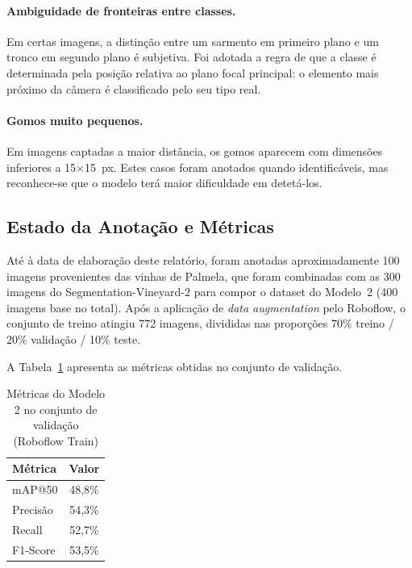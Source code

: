 \paragraph{Ambiguidade de fronteiras entre classes.}
Em certas imagens, a distinção entre um sarmento em primeiro plano e um
tronco em segundo plano é subjetiva. Foi adotada a regra de que a classe é
determinada pela posição relativa ao plano focal principal: o elemento mais
próximo da câmera é classificado pelo seu tipo real.

\paragraph{Gomos muito pequenos.}
Em imagens captadas a maior distância, os gomos aparecem com dimensões
inferiores a 15$\times$15~px. Estes casos foram anotados quando identificáveis,
mas reconhece-se que o modelo terá maior dificuldade em detetá-los.

\subsection{Estado da Anotação e Métricas}

Até à data de elaboração deste relatório, foram anotadas aproximadamente
100 imagens provenientes das vinhas de Palmela, que foram
combinadas com as 300 imagens do Segmentation-Vineyard-2 para compor o
dataset do Modelo~2 (400 imagens base no total). Após a aplicação de
\textit{data augmentation} pelo Roboflow, o conjunto de treino atingiu
772 imagens, divididas nas proporções 70\% treino / 20\% validação /
10\% teste.

A Tabela~\ref{tab:resultados_m2_dev} apresenta as métricas obtidas no
conjunto de validação.

\begin{table}[H]
  \centering
  \caption{Métricas do Modelo 2 no conjunto de validação (Roboflow Train)}
  \label{tab:resultados_m2_dev}
  \begin{tabular}{lc}
    \toprule
    \textbf{Métrica}   & \textbf{Valor} \\
    \midrule
    mAP@50             & 48,8\% \\
    Precisão           & 54,3\% \\
    Recall             & 52,7\% \\
    F1-Score           & 53,5\% \\
    \bottomrule
  \end{tabular}
\end{table}

